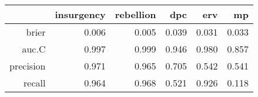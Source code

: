 \begin{tabular}{rrrrrr}
  \hline
 & insurgency & rebellion & dpc & erv & mp \\ 
  \hline
brier & 0.006 & 0.005 & 0.039 & 0.031 & 0.033 \\ 
  auc.C & 0.997 & 0.999 & 0.946 & 0.980 & 0.857 \\ 
  precision & 0.971 & 0.965 & 0.705 & 0.542 & 0.541 \\ 
  recall & 0.964 & 0.968 & 0.521 & 0.926 & 0.118 \\ 
   \hline
\end{tabular}
